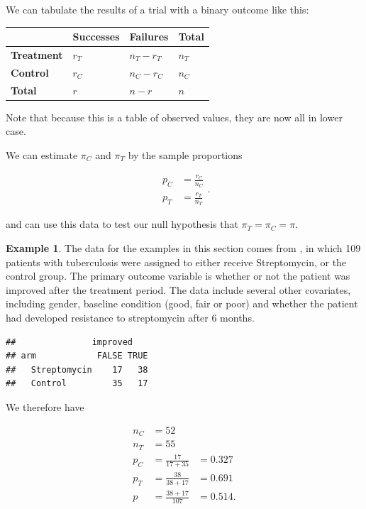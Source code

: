 \documentclass[
  openany]{book}
\theoremstyle{definition}
\theoremstyle{definition}
\newtheorem{example}{Example}[chapter]
\theoremstyle{definition}
\theoremstyle{definition}
\theoremstyle{remark}
\begin{document}
We can tabulate the results of a trial with a binary outcome like this:

\begin{longtable}[]{@{}llll@{}}
\toprule\noalign{}
& Successes & Failures & Total \\
\midrule\noalign{}
\endhead
\bottomrule\noalign{}
\endlastfoot
\textbf{Treatment} & \(r_T\) & \(n_T-r_T\) & \(n_T\) \\
\textbf{Control} & \(r_C\) & \(n_C-r_C\) & \(n_C\) \\
\textbf{Total} & \(r\) & \(n - r\) & \(n\) \\
\end{longtable}

Note that because this is a table of observed values, they are now all in lower case.

We can estimate \(\pi_C\) and \(\pi_T\) by the sample proportions

\[
\begin{aligned}
p_C &= \frac{r_C}{n_C}\\
p_T &= \frac{r_T}{n_T}
\end{aligned}.
\]

and can use this data to test our null hypothesis that \(\pi_T  = \pi_C = \pi\).

\begin{example}
\protect\hypertarget{exm:ex-bin1}{}\label{exm:ex-bin1}The data for the examples in this section comes from \citet{strep_tb}, in which 109 patients with tuberculosis were assigned to either receive Streptomycin, or the control group. The primary outcome variable is whether or not the patient was improved after the treatment period. The data include several other covariates, including gender, baseline condition (good, fair or poor) and whether the patient had developed resistance to streptomycin after 6 months.

\begin{verbatim}
##               improved
## arm            FALSE TRUE
##   Streptomycin    17   38
##   Control         35   17
\end{verbatim}

We therefore have

\[
\begin{aligned}
n_C & = 52 \\
n_T & = 55 \\
p_C & = \frac{17}{17+35} & = 0.327\\
p_T & = \frac{38}{38+17} & = 0.691\\
p & = \frac{38+17}{107} &= 0.514. 
\end{aligned}
\]
\end{example}
\end{document}
